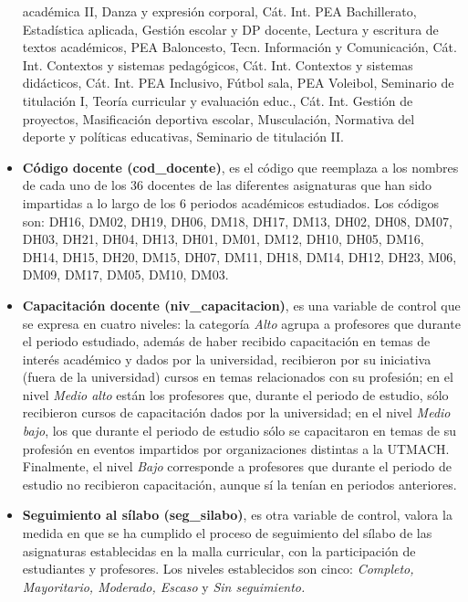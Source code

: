 \documentclass[mathematics,article,submit,moreauthors,pdftex]{mdpi}
\begin{document}
\begin{itemize}
  académica II, Danza y expresión corporal, Cát. Int. PEA Bachillerato,
  Estadística aplicada, Gestión escolar y DP docente, Lectura y
  escritura de textos académicos, PEA Baloncesto, Tecn. Información y
  Comunicación, Cát. Int. Contextos y sistemas pedagógicos, Cát. Int.
  Contextos y sistemas didácticos, Cát. Int. PEA Inclusivo, Fútbol sala,
  PEA Voleibol, Seminario de titulación I, Teoría curricular y
  evaluación educ., Cát. Int. Gestión de proyectos, Masificación
  deportiva escolar, Musculación, Normativa del deporte y políticas
  educativas, Seminario de titulación II.\\
\item
  \textbf{Código docente (cod\_docente)}, es el código que reemplaza a
  los nombres de cada uno de los 36 docentes de las diferentes
  asignaturas que han sido impartidas a lo largo de los 6 periodos
  académicos estudiados. Los códigos son: DH16, DM02, DH19, DH06, DM18,
  DH17, DM13, DH02, DH08, DM07, DH03, DH21, DH04, DH13, DH01, DM01,
  DM12, DH10, DH05, DM16, DH14, DH15, DH20, DM15, DH07, DM11, DH18,
  DM14, DH12, DH23, M06, DM09, DM17, DM05, DM10, DM03.\\
\item
  \textbf{Capacitación docente (niv\_capacitacion)}, es una variable de
  control que se expresa en cuatro niveles: la categoría \emph{Alto}
  agrupa a profesores que durante el periodo estudiado, además de haber
  recibido capacitación en temas de interés académico y dados por la
  universidad, recibieron por su iniciativa (fuera de la universidad)
  cursos en temas relacionados con su profesión; en el nivel \emph{Medio
  alto} están los profesores que, durante el periodo de estudio, sólo
  recibieron cursos de capacitación dados por la universidad; en el
  nivel \emph{Medio bajo}, los que durante el periodo de estudio sólo se
  capacitaron en temas de su profesión en eventos impartidos por
  organizaciones distintas a la UTMACH. Finalmente, el nivel \emph{Bajo}
  corresponde a profesores que durante el periodo de estudio no
  recibieron capacitación, aunque sí la tenían en periodos anteriores.\\
\item
  \textbf{Seguimiento al sílabo (seg\_silabo)}, es otra variable de
  control, valora la medida en que se ha cumplido el proceso de
  seguimiento del sílabo de las asignaturas establecidas en la malla
  curricular, con la participación de estudiantes y profesores. Los
  niveles establecidos son cinco: \emph{Completo, Mayoritario, Moderado,
  Escaso} y \emph{Sin seguimiento.}\\

\end{itemize}
\end{document}
